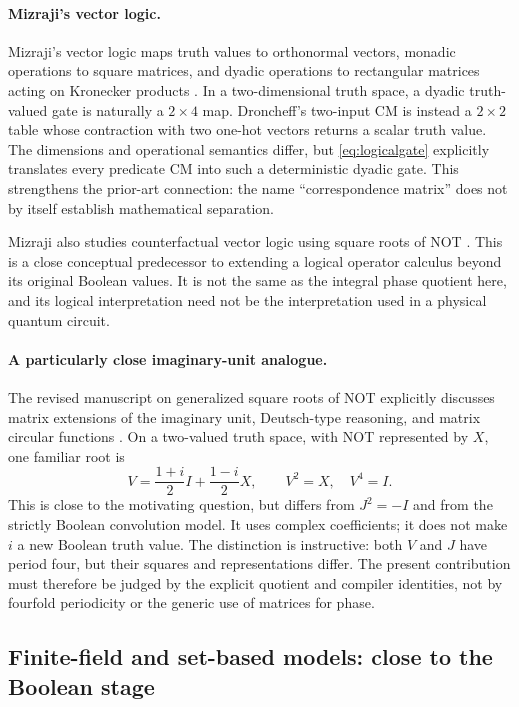 \paragraph{Mizraji's vector logic.}
Mizraji's vector logic maps truth values to orthonormal vectors, monadic operations to square matrices, and dyadic operations to rectangular matrices acting on Kronecker products \cite{mizraji2008}. In a two-dimensional truth space, a dyadic truth-valued gate is naturally a $2\times4$ map. Droncheff's two-input CM is instead a $2\times2$ table whose contraction with two one-hot vectors returns a scalar truth value. The dimensions and operational semantics differ, but \cref{eq:logicalgate} explicitly translates every predicate CM into such a deterministic dyadic gate. This strengthens the prior-art connection: the name ``correspondence matrix'' does not by itself establish mathematical separation.

Mizraji also studies counterfactual vector logic using square roots of NOT \cite{mizraji2021}. This is a close conceptual predecessor to extending a logical operator calculus beyond its original Boolean values. It is not the same as the integral phase quotient here, and its logical interpretation need not be the interpretation used in a physical quantum circuit.

\paragraph{A particularly close imaginary-unit analogue.}
The revised manuscript on generalized square roots of NOT explicitly discusses matrix extensions of the imaginary unit, Deutsch-type reasoning, and matrix circular functions \cite{mizraji2024}. On a two-valued truth space, with NOT represented by $X$, one familiar root is
\begin{equation}
 V=\frac{1+i}{2}I+\frac{1-i}{2}X,\qquad V^2=X,\quad V^4=I.
\end{equation}
This is close to the motivating question, but differs from $J^2=-I$ and from the strictly Boolean convolution model. It uses complex coefficients; it does not make $i$ a new Boolean truth value. The distinction is instructive: both $V$ and $J$ have period four, but their squares and representations differ. The present contribution must therefore be judged by the explicit quotient and compiler identities, not by fourfold periodicity or the generic use of matrices for phase.

\subsection{Finite-field and set-based models: close to the Boolean stage}
